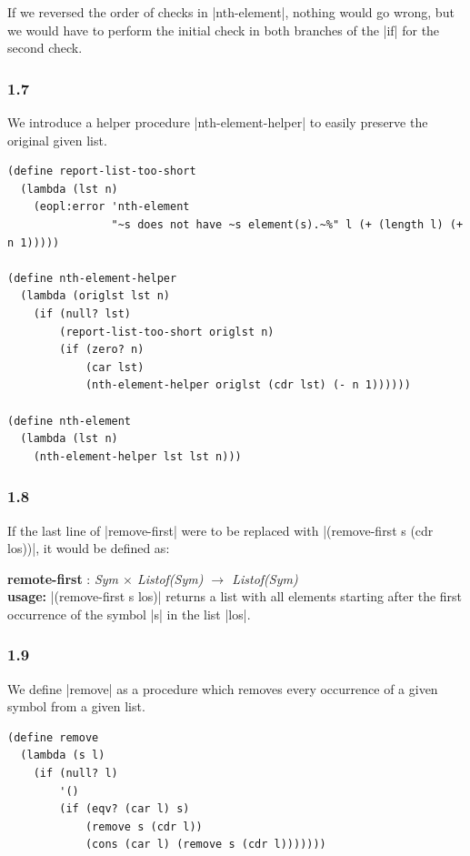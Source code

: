\documentclass[a4paper]{article}
\begin{document}
If we reversed the order of checks in |nth-element|, nothing would go wrong, but we would have to perform the initial check in both branches of the |if| for the second check.

\subsubsection*{1.7}

We introduce a helper procedure |nth-element-helper| to easily preserve the original given list.

\begin{lstlisting}
(define report-list-too-short
  (lambda (lst n)
    (eopl:error 'nth-element
                "~s does not have ~s element(s).~%" l (+ (length l) (+ n 1)))))

(define nth-element-helper
  (lambda (origlst lst n)
    (if (null? lst)
        (report-list-too-short origlst n)
        (if (zero? n)
            (car lst)
            (nth-element-helper origlst (cdr lst) (- n 1))))))

(define nth-element
  (lambda (lst n)
    (nth-element-helper lst lst n)))
\end{lstlisting}

\subsubsection*{1.8}

If the last line of |remove-first| were to be replaced with |(remove-first s (cdr los))|, it would be defined as:

\textbf{remote-first} : \textit{Sym $\times$ Listof(Sym) $\rightarrow$ Listof(Sym)}\\
\textbf{usage:} |(remove-first s los)| returns a list with all elements starting after the first occurrence of the symbol |s| in the list |los|.

\subsubsection*{1.9}

We define |remove| as a procedure which removes every occurrence of a given symbol from a given list.

\begin{lstlisting}
(define remove
  (lambda (s l)
    (if (null? l)
        '()
        (if (eqv? (car l) s)
            (remove s (cdr l))
            (cons (car l) (remove s (cdr l)))))))
\end{lstlisting}
\end{document}
